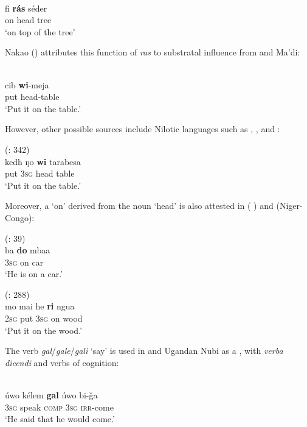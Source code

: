 \documentclass[output=paper]{langsci/langscibook}
\begin{document}
\ex
{} \citep[159]{Wellens2003}\\
\gll     fi \textbf{rá}\textbf{s} séder\\
         on head tree\\
\glt       `on top of the tree'
\z
\z

Nakao (\citeyear[141]{Nakao2012}) attributes this function of \textit{ras} to substratal influence from  and Ma'di:

\ea
{ \citep[141]{Nakao2012}}\\
\gll            cib \textbf{wi}-meja\\
                put head-table\\
\glt     `Put it on the table.'
\z
 
However, other possible sources include  Nilotic languages such as , ,  and :

\ea
{  (\citealt{PozzatiPanza1993}: 342)}\\
\gll     kedh ŋo \textbf{wi} tarabesa\\
         put 3\textsc{sg} head table\\
\glt     `Put it on the table.'
\z

Moreover, a  ‘on’ derived from the noun ‘head’ is also attested in  ( ) and  (Niger-Congo):

\ea
{ (\citealt{Moietal2014}: 39)}\\
\gll            ba \textbf{do} mbaa\\
                3\textsc{sg} on car\\
\glt     `He is on a car.'
\z

\ea
{ (\citealt{DeAngelis2002}: 288)}\\
\gll            mo mai he \textbf{ri} ngua\\
                2\textsc{sg} put 3\textsc{sg} on wood\\
\glt     `Put it on the wood.'
\z

The verb \textit{gal}/\textit{gale}/\textit{gali} ‘say’ is used in   and Ugandan Nubi as a , with \textit{verba} \textit{dicendi} and verbs of cognition:

\ea
\ea {}  \citep[469]{Miller2001}\\
\gll     úwo kélem \textbf{gal} úwo bi-ǧa\\
         3\textsc{sg} speak \textsc{comp} 3\textsc{sg} \textsc{irr}-come\\
\glt       `He said that he would come.'
\end{document}
